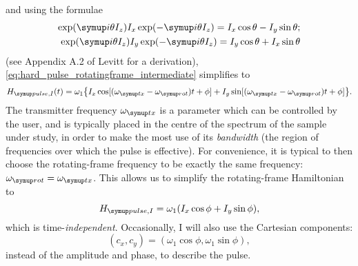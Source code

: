and using the formulae
\begin{align}
    \exp(\mi\theta I_z)I_x\exp(-\mi\theta I_z) = I_x\cos\theta - I_y\sin\theta \label{eq:sandwich_formula_1}; \\
    \exp(\mi\theta I_z)I_y\exp(-\mi\theta I_z) = I_y\cos\theta + I_x\sin\theta \label{eq:sandwich_formula_2}
\end{align}
(see Appendix A.2 of Levitt\autocite{Levitt2008} for a derivation), \cref{eq:hard_pulse_rotatingframe_intermediate} simplifies to
\begin{equation}
    \label{eq:hard_pulse_rotatingframe}
    \HpulseI(t) = \omega_1 \big\{I_x \cos[(\omegatx - \omegarot)t + \phi] + I_y \sin[(\omegatx - \omegarot)t + \phi] \big\}.
\end{equation}
The transmitter frequency $\omegatx$ is a parameter which can be controlled by the user, and is typically placed in the centre of the spectrum of the sample under study, in order to make the most use of its \textit{bandwidth} (the region of frequencies over which the pulse is effective).
For convenience, it is typical to then choose the rotating-frame frequency to be exactly the same frequency: $\omegarot = \omegatx$.
This allows us to simplify the rotating-frame Hamiltonian to
\begin{equation}
    \label{eq:hard_pulse_onresonance}
    \HpulseI = \omega_1 (I_x\cos\phi + I_y\sin\phi),
\end{equation}
which is time-\textit{independent}.
Occasionally, I will also use the Cartesian components:
\begin{equation}
    \label{eq:pulse_cartesian}
    (c_x, c_y) = (\omega_1 \cos\phi, \omega_1 \sin\phi),
\end{equation}
instead of the amplitude and phase, to describe the pulse.

